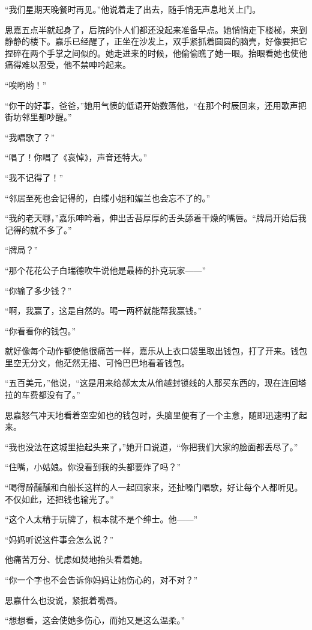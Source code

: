 \par “我们星期天晚餐时再见。”他说着走了出去，随手悄无声息地关上门。
\par 思嘉五点半就起身了，后院的仆人们都还没起来准备早点。她悄悄走下楼梯，来到静静的楼下。嘉乐已经醒了，正坐在沙发上，双手紧抓着圆圆的脑壳，好像要把它捏碎在两个手掌之间似的。她走进来的时候，他偷偷瞧了她一眼。抬眼看她也使他痛得难以忍受，他不禁呻吟起来。
\par “唉哟哟！”
\par “你干的好事，爸爸，”她用气愤的低语开始数落他，“在那个时辰回来，还用歌声把街坊邻里都吵醒。”
\par “我唱歌了？”
\par “唱了！你唱了《哀悼》，声音还特大。”
\par “我不记得了！”
\par “邻居至死也会记得的，白蝶小姐和媚兰也会忘不了的。”
\par “我的老天哪，”嘉乐呻吟着，伸出舌苔厚厚的舌头舔着干燥的嘴唇。“牌局开始后我记得的就不多了。”
\par “牌局？”
\par “那个花花公子白瑞德吹牛说他是最棒的扑克玩家——”
\par “你输了多少钱？”
\par “啊，我赢了，这是自然的。喝一两杯就能帮我赢钱。”
\par “你看看你的钱包。”
\par 就好像每个动作都使他很痛苦一样，嘉乐从上衣口袋里取出钱包，打了开来。钱包里空无分文，他茫然无措、可怜巴巴地看着钱包。
\par “五百美元，”他说，“这是用来给郝太太从偷越封锁线的人那买东西的，现在连回塔拉的车费都没有了。”
\par 思嘉怒气冲天地看着空空如也的钱包时，头脑里便有了一个主意，随即迅速明了起来。
\par “我也没法在这城里抬起头来了，”她开口说道，“你把我们大家的脸面都丢尽了。”
\par “住嘴，小姑娘。你没看到我的头都要炸了吗？”
\par “喝得醉醺醺和白船长这样的人一起回家来，还扯嗓门唱歌，好让每个人都听见。不仅如此，还把钱也输光了。”
\par “这个人太精于玩牌了，根本就不是个绅士。他——”
\par “妈妈听说这件事会怎么说？”
\par 他痛苦万分、忧虑如焚地抬头看着她。
\par “你一个字也不会告诉你妈妈让她伤心的，对不对？”
\par 思嘉什么也没说，紧抿着嘴唇。
\par “想想看，这会使她多伤心，而她又是这么温柔。”
